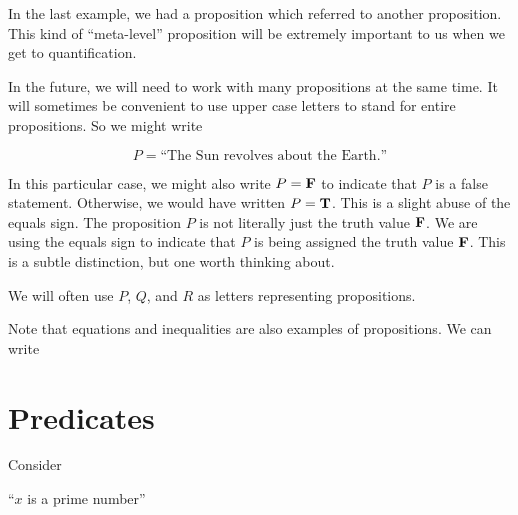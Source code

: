 In the last example, we had a proposition which referred to another proposition.  This kind of ``meta-level'' proposition will be extremely important to us when we get to quantification. 

In the future, we will need to work with many propositions at the same time.  It will sometimes be convenient to use upper case letters to stand for entire propositions.  So we might write

		\[P  =  \textrm{``The Sun revolves about the Earth.''} \]

In this particular case, we might also write $P = \textbf{\textrm{F}}$ to indicate that $P$ is a false statement.  Otherwise, we would have written $P = \textbf{\textrm{T}}$.  This is a slight abuse of the equals sign.  The proposition $P$ is not literally just the truth value $\textbf{\textrm{F}}$.  We are using the equals sign to indicate that $P$ is being assigned the truth value $\textbf{\textrm{F}}$.  This is a subtle distinction, but one worth thinking about.

We will often use $P$, $Q$, and $R$ as letters representing propositions.

Note that equations and inequalities are also examples of propositions. We can write


\section{Predicates}

Consider

\begin{center}
``$x$ is a prime number''
\end{center}

